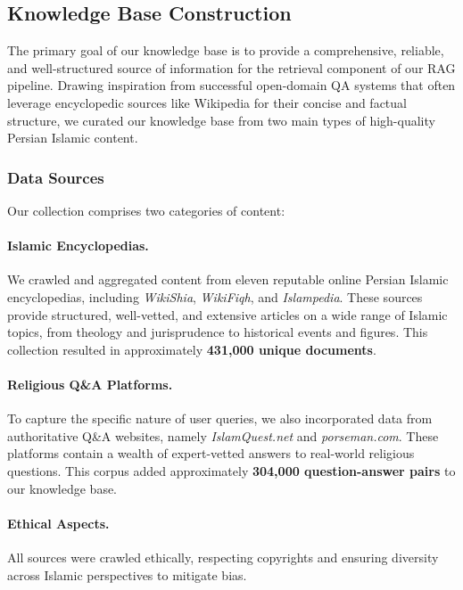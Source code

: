 \documentclass[11pt]{article}
\begin{document}
\subsection{Knowledge Base Construction}

The primary goal of our knowledge base is to provide a comprehensive, reliable, and well-structured source of information for the retrieval component of our RAG pipeline. Drawing inspiration from successful open-domain QA systems that often leverage encyclopedic sources like Wikipedia \cite{chen2017reading} for their concise and factual structure, we curated our knowledge base from two main types of high-quality Persian Islamic content.

\subsubsection{Data Sources}

Our collection comprises two categories of content:

\paragraph{Islamic Encyclopedias.}
We crawled and aggregated content from eleven reputable online Persian Islamic encyclopedias, including \emph{WikiShia}, \emph{WikiFiqh}, and \emph{Islampedia}. These sources provide structured, well-vetted, and extensive articles on a wide range of Islamic topics, from theology and jurisprudence to historical events and figures. This collection resulted in approximately \textbf{431,000 unique documents}.

\paragraph{Religious Q\&A Platforms.}
To capture the specific nature of user queries, we also incorporated data from authoritative Q\&A websites, namely \emph{IslamQuest.net} and \emph{porseman.com}. These platforms contain a wealth of expert-vetted answers to real-world religious questions. This corpus added approximately \textbf{304,000 question-answer pairs} to our knowledge base.

\paragraph{Ethical Aspects.}
All sources were crawled ethically, respecting copyrights and ensuring diversity across Islamic perspectives to mitigate bias.
\end{document}

